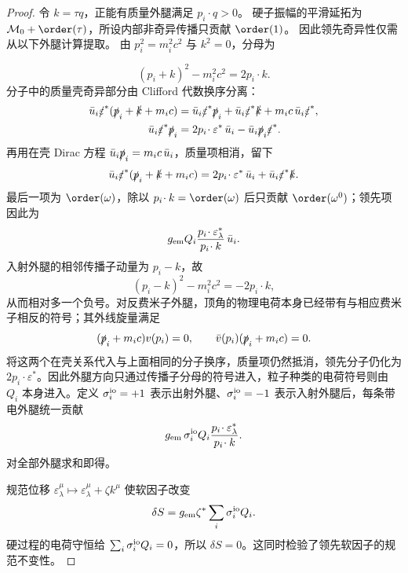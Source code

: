 \begin{proof}
令 $k=\tau q$，正能有质量外腿满足 $p_i\cdot q>0$。
硬子振幅的平滑延拓为 $\mathcal M_0+\order(\tau)$，所设内部非奇异传播只贡献 $\order(1)$。
因此领先奇异性仅需从以下外腿计算提取。
由 $p_i^2=m_i^2c^2$ 与 $k^2=0$，分母为

\begin{equation*}
 (p_i+k)^2-m_i^2c^2=2p_i\!\cdot k.
\end{equation*}
分子中的质量壳奇异部分由 Clifford 代数换序分离：
\begin{align*}
 \bar u_i\slashed\varepsilon^*(\slashed p_i+\slashed k+m_ic)
 &=\bar u_i\slashed\varepsilon^*\slashed p_i
   +\bar u_i\slashed\varepsilon^*\slashed k
   +m_ic\,\bar u_i\slashed\varepsilon^*,\\
 \bar u_i\slashed\varepsilon^*\slashed p_i
 &=2p_i\!\cdot\varepsilon^*\,\bar u_i
   -\bar u_i\slashed p_i\slashed\varepsilon^*.
\end{align*}
再用在壳 Dirac 方程 $\bar u_i\slashed p_i=m_ic\,\bar u_i$，质量项相消，留下
\begin{equation*}
 \bar u_i\slashed\varepsilon^*(\slashed p_i+\slashed k+m_ic)
 =2p_i\!\cdot\varepsilon^*\,\bar u_i
 +\bar u_i\slashed\varepsilon^*\slashed k.
\end{equation*}
最后一项为 $\order(\omega)$，除以 $p_i\!\cdot k=\order(\omega)$ 后只贡献 $\order(\omega^0)$；领先项因此为
\begin{equation*}
 g_{\rm em}Q_i
 \frac{p_i\!\cdot\varepsilon_\lambda^*}{p_i\!\cdot k}\,\bar u_i.
\end{equation*}
入射外腿的相邻传播子动量为 $p_i-k$，故
\begin{equation*}
 (p_i-k)^2-m_i^2c^2=-2p_i\!\cdot k,
\end{equation*}
从而相对多一个负号。对反费米子外腿，顶角的物理电荷本身已经带有与相应费米子相反的符号；其外线旋量满足
\[
 (\slashed p_i+m_ic)v(p_i)=0,
 \qquad
 \bar v(p_i)(\slashed p_i+m_ic)=0.
\]
将这两个在壳关系代入与上面相同的分子换序，质量项仍然抵消，领先分子仍化为 $2p_i\!\cdot\varepsilon^*$。因此外腿方向只通过传播子分母的符号进入，粒子种类的电荷符号则由 $Q_i$ 本身进入。定义 $\sigma_i^{\rm io}=+1$ 表示出射外腿、$\sigma_i^{\rm io}=-1$ 表示入射外腿后，每条带电外腿统一贡献
\[
 g_{\rm em}\,\sigma_i^{\rm io}Q_i
 \frac{p_i\!\cdot\varepsilon_\lambda^*}{p_i\!\cdot k}.
\]
对全部外腿求和即得。

规范位移 $\varepsilon_\lambda^\mu\mapsto\varepsilon_\lambda^\mu+\zeta k^\mu$ 使软因子改变
\begin{equation*}
 \delta S=g_{\rm em}\zeta^*\sum_i\sigma_i^{\rm io}Q_i.
\end{equation*}
硬过程的电荷守恒给 $\sum_i\sigma_i^{\rm io}Q_i=0$，所以 $\delta S=0$。这同时检验了领先软因子的规范不变性。
\end{proof}

